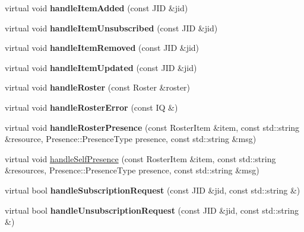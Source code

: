 \begin{DoxyCompactItemize}
\item 
\hypertarget{classBot_a89edf827c5a2fa8fc22bde8b75dcb1be}{
virtual void {\bfseries handleItemAdded} (const JID \&jid)}
\label{classBot_a89edf827c5a2fa8fc22bde8b75dcb1be}

\item 
\hypertarget{classBot_a6e5060ee48472413dfed3dfb84c3d20d}{
virtual void {\bfseries handleItemUnsubscribed} (const JID \&jid)}
\label{classBot_a6e5060ee48472413dfed3dfb84c3d20d}

\item 
\hypertarget{classBot_a6eeac59b6ea7a4a52256874b58e072a7}{
virtual void {\bfseries handleItemRemoved} (const JID \&jid)}
\label{classBot_a6eeac59b6ea7a4a52256874b58e072a7}

\item 
\hypertarget{classBot_a38fe52b899f5eb99c12a555728ab7df9}{
virtual void {\bfseries handleItemUpdated} (const JID \&jid)}
\label{classBot_a38fe52b899f5eb99c12a555728ab7df9}

\item 
\hypertarget{classBot_af350006e8c887cc7c0f20f71e49d8a84}{
virtual void {\bfseries handleRoster} (const Roster \&roster)}
\label{classBot_af350006e8c887cc7c0f20f71e49d8a84}

\item 
\hypertarget{classBot_aba30911c417ebb2effd79cded20a0b8d}{
virtual void {\bfseries handleRosterError} (const IQ \&)}
\label{classBot_aba30911c417ebb2effd79cded20a0b8d}

\item 
\hypertarget{classBot_a3a0fe7dc3507fbc8f77320df7e099067}{
virtual void {\bfseries handleRosterPresence} (const RosterItem \&item, const std::string \&resource, Presence::PresenceType presence, const std::string \&msg)}
\label{classBot_a3a0fe7dc3507fbc8f77320df7e099067}

\item 
virtual void \hyperlink{classBot_ad88d08d22a123e47dd78fc364e0182e4}{handleSelfPresence} (const RosterItem \&item, const std::string \&resources, Presence::PresenceType presence, const std::string \&msg)
\item 
\hypertarget{classBot_a2f354257d06774aae9caf3942ea74ed6}{
virtual bool {\bfseries handleSubscriptionRequest} (const JID \&jid, const std::string \&)}
\label{classBot_a2f354257d06774aae9caf3942ea74ed6}

\item 
\hypertarget{classBot_ac0576c0cad473b4506a67e728666c313}{
virtual bool {\bfseries handleUnsubscriptionRequest} (const JID \&jid, const std::string \&)}
\label{classBot_ac0576c0cad473b4506a67e728666c313}


\end{DoxyCompactItemize}
